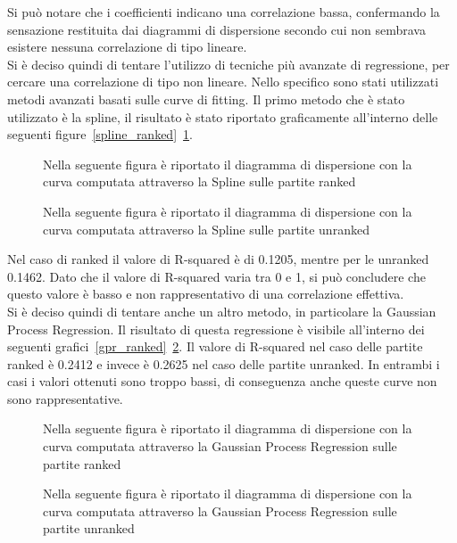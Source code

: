 Si può notare che i coefficienti indicano una correlazione bassa, confermando la sensazione restituita dai diagrammi di dispersione secondo cui non sembrava esistere nessuna correlazione di tipo lineare. \\
Si è deciso quindi di tentare l'utilizzo di tecniche più avanzate di regressione, per cercare una correlazione di tipo non lineare. Nello specifico sono stati utilizzati metodi avanzati basati sulle curve di fitting. Il primo metodo che è stato utilizzato è la spline, il risultato è stato riportato graficamente all'interno delle seguenti figure~\ref{spline_ranked}~\ref{spline_unranked}. 
\begin{figure}[htbp]
\centering
\begin{multicols}{2}
\hspace*{-0.2\linewidth}

\caption{Nella seguente figura è riportato il diagramma di dispersione con la curva computata attraverso la Spline sulle partite ranked}
\label{spline_ranked}
\hspace*{-0.1\linewidth}

\caption{Nella seguente figura è riportato il diagramma di dispersione con la curva computata attraverso la Spline sulle partite unranked}
\label{spline_unranked}
\end{multicols}
\end{figure}
Nel caso di ranked il valore di R-squared è di 0.1205, mentre per le unranked 0.1462. Dato che il valore di R-squared varia tra 0 e 1, si può concludere che questo valore è basso e non rappresentativo di una correlazione effettiva.\\
Si è deciso quindi di tentare anche un altro metodo, in particolare la Gaussian Process Regression. Il risultato di questa regressione è visibile all'interno dei seguenti grafici~\ref{gpr_ranked}~\ref{gpr_unranked}. Il valore di R-squared nel caso delle partite ranked è 0.2412 e invece è 0.2625 nel caso delle partite unranked. In entrambi i casi i valori ottenuti sono troppo bassi, di conseguenza anche queste curve non sono rappresentative.
\begin{figure}[htbp]
\centering
\begin{multicols}{2}
\hspace*{-0.2\linewidth}

\caption{Nella seguente figura è riportato il diagramma di dispersione con la curva computata attraverso la Gaussian Process Regression sulle partite ranked}
\label{gpr_ranked}
\hspace*{-0.1\linewidth}

\caption{Nella seguente figura è riportato il diagramma di dispersione con la curva computata attraverso la Gaussian Process Regression sulle partite unranked}
\label{gpr_unranked}
\end{multicols}
\end{figure}
